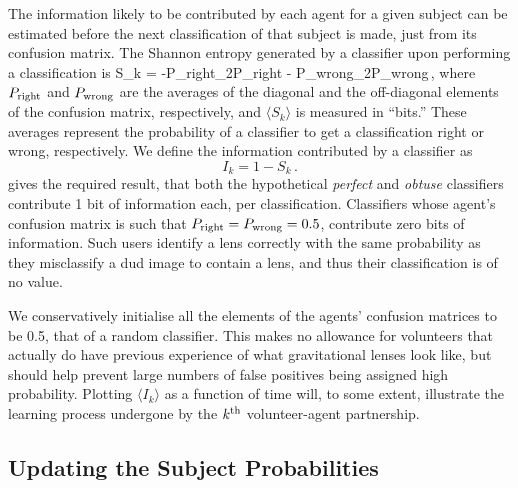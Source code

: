 \documentclass[useAMS,usenatbib,a4paper]{mn2e}
\begin{document}
The information likely to be contributed by each agent for a given subject
can be estimated before the next classification of that subject is made, 
just from its confusion matrix.
The Shannon entropy generated by a classifier upon performing a
classification is
\be
  \langle S_k \rangle =  
   -P_{\rm right}\cdot\log_2{P_{\rm right}} -  P_{\rm wrong}\cdot\log_2P_{\rm wrong}\,,
\ee
where $P_{\rm right}$ and $P_{\rm wrong}$ are the averages of the diagonal and
the off-diagonal elements of the confusion matrix, respectively, and $\langle
S_k \rangle$ is measured in ``bits.'' These averages represent the probability
of a classifier to get a classification right or wrong, respectively. We define
the information contributed by a classifier as
\begin{equation}
I_k = 1 - S_k\,.
  \label{eq:app:info}
\end{equation}
 gives the required result, that both the hypothetical {\it
perfect} and {\it obtuse} classifiers contribute 1 bit of information each, per
classification. Classifiers whose agent's confusion matrix is such that $P_{\rm
right}=P_{\rm wrong}=0.5$, contribute zero bits of information. Such users
identify a lens correctly with the same probability as they misclassify a dud
image to contain a lens, and thus their classification is of no value. 

We conservatively initialise all the elements of the agents' confusion matrices
to be 0.5, that of a random classifier. This makes no allowance for volunteers
that actually do have previous experience of what gravitational lenses look
like, but should help prevent large numbers of false positives being assigned
high probability. Plotting  $\langle I_k \rangle$ as a function of time will,
to some extent, illustrate the learning process undergone by the $k^{\rm th}$
volunteer-agent partnership. 

\subsection{Updating the Subject Probabilities}
\label{appendix:swap:examples}
\end{document}
